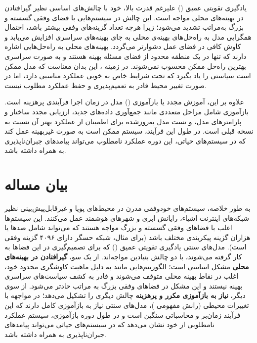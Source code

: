 \documentclass[oneside,openany,phd]{TMU-Thesis}
\begin{document}
یادگیری تقویتی عمیق () علیرغم قدرت بالا، خود با چالش‌های اساسی نظیر گیرافتادن در بهینه‌های محلی مواجه است. این چالش در سیستم‌هایی با فضای وفقی گسسته و بزرگ به‌مراتب تشدید می‌شود؛ زیرا هرچه تعداد گزینه‌های وفقی بیشتر باشد، احتمال همگرایی مدل به راه‌حل‌های بهینه‌ی محلی به جای بهینه‌های سراسری افزایش می‌یابد و کاوش کافی در فضای عمل دشوارتر می‌گردد. بهینه‌های محلی به راه‌حل‌هایی اشاره دارند که تنها در یک منطقه محدود از فضای مسئله بهینه هستند و به صورت سراسری بهترین راه‌حل ممکن محسوب نمی‌شوند. در زمینه ، این بدان معناست که مدل ممکن است سیاستی را یاد بگیرد که تحت شرایط خاص به خوبی عملکرد مناسبی دارد، اما در صورت تغییر محیط قادر به تعمیم‌پذیری و حفظ عملکرد مطلوب نیست.

علاوه بر این، آموزش مجدد یا بازآموزی () مدل در زمان اجرا فرآیندی پرهزینه است. بازآموزی شامل مراحل متعددی مانند جمع‌آوری داده‌های جدید، ارزیابی مجدد ساختار و پارامترهای مدل، و تست مدل به‌روزشده برای اطمینان از عملکرد بهتر آن نسبت به نسخه قبلی است. در طول این فرآیند، سیستم ممکن است به صورت غیربهینه عمل کند که در سیستم‌های حیاتی، این دوره عملکرد نامطلوب می‌تواند پیامدهای جبران‌ناپذیری به همراه داشته باشد.

\section{بیان مساله}

به طور خلاصه، سیستم‌های خودوفقی مدرن در محیط‌های پویا و غیرقابل‌پیش‌بینی نظیر شبکه‌های اینترنت اشیاء، رایانش ابری و شهرهای هوشمند عمل می‌کنند. این سیستم‌ها اغلب با فضاهای وفقی گسسته و بزرگ مواجه هستند که می‌تواند شامل صد‌ها یا هزاران گزینه پیکربندی مختلف باشد (برای مثال، شبکه حسگر  \cite{gerostathopoulos2019deltaiot} دارای ۴۰۹۶ گزینه وفقی است). مدل‌های سنتی یادگیری تقویتی عمیق () که برای تصمیم‌گیری در این فضاها به کار گرفته می‌شوند، با دو چالش بنیادین مواجه‌اند.
از یک سو، \textbf{گیرافتادن در بهینه‌های محلی} مشکل اساسی است؛ الگوریتم‌هایی مانند  به دلیل ماهیت کاوشگری محدود خود، اغلب در نقاط بهینه محلی متوقف می‌شوند و قادر به کشف سیاست‌های سراسری بهینه نیستند \cite{du2023alleviating} و این مشکل در فضاهای وفقی بزرگ به مراتب حادتر می‌شود.
از سوی دیگر، \textbf{نیاز به بازآموزی مکرر و پرهزینه} چالش دیگری را تشکیل می‌دهد؛ در مواجهه با تغییرات محیطی (رانش مفهومی \cite{gheibi2024dealing})، مدل‌های سنتی نیاز به بازآموزی کامل دارند که این فرآیند زمان‌بر و محاسباتی سنگین است و در طول دوره بازآموزی، سیستم عملکرد نامطلوبی از خود نشان می‌دهد که در سیستم‌های حیاتی می‌تواند پیامدهای جبران‌ناپذیری به همراه داشته باشد.
\end{document}
